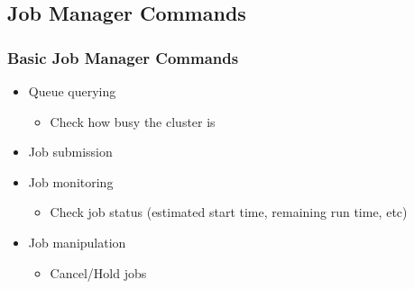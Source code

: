 \documentclass[slidestop,mathserif,compress,xcolor=svgnames,table]{beamer}
\newenvironment{bblock}[0]
{
\begin{beamerboxesrounded}[upper=uppercol1,lower=lowercol1,shadow=true]}
{\end{beamerboxesrounded}}
\begin{document}
\subsection{Job Manager Commands}
\begin{frame}
  \frametitle{\small Basic Job Manager Commands}
  \begin{bblock}{}
    \begin{itemize}
      \item Queue querying
      \begin{itemize}
	\item Check how busy the cluster is
      \end{itemize}
      \item Job submission
      \item Job monitoring
      \begin{itemize}
	\item Check job status (estimated start time, remaining run time, etc)
      \end{itemize}
      \item Job manipulation
      \begin{itemize}
	\item Cancel/Hold jobs
      \end{itemize}
    \end{itemize}
  \end{bblock}
\end{frame}
\end{document}
